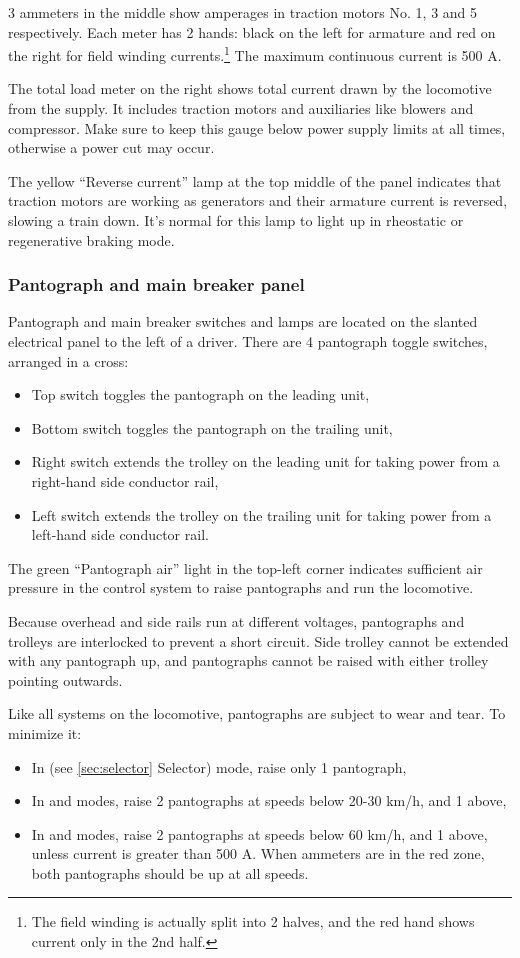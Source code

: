 \documentclass[11pt, a4paper]{article}
\newcommand{\powermode}[1]{%
    \begingroup
    \setlength{\fboxsep}{0pt}%
    \raisebox{0.1em}{%
        \colorbox{black}{%
            \parbox[c][1.4em][c]{1.4em}{%
                \centering
                \color{white}\bfseries #1%
            }%
        }%
    }%
    \endgroup
}
\newcommand{\brakemode}[1]{%
    \begingroup
    \setlength{\fboxsep}{0pt}%
    \raisebox{0.1em}{%
        \colorbox{red}{%
            \parbox[c][1.4em][c]{1.4em}{%
                \centering
                \color{black}\bfseries #1%
            }%
        }%
    }%
    \endgroup
}
\begin{document}
3 ammeters in the middle show amperages in traction motors No. 1, 3 and 5 respectively. Each meter has 2 hands: black on the left for armature and red on the right for field winding currents.\footnote{The field winding is actually split into 2 halves, and the red hand shows current only in the 2nd half.} The maximum continuous current is 500 A.

The total load meter on the right shows total current drawn by the locomotive from the supply. It includes traction motors and auxiliaries like blowers and compressor. Make sure to keep this gauge below power supply limits at all times, otherwise a power cut may occur.

The yellow ``Reverse current'' lamp at the top middle of the panel indicates that traction motors are working as generators and their armature current is reversed, slowing a train down. It's normal for this lamp to light up in rheostatic or regenerative braking mode.
\newpage

\subsubsection{Pantograph and main breaker panel}
Pantograph and main breaker switches and lamps are located on the slanted electrical panel to the left of a driver. There are 4 pantograph toggle switches, arranged in a cross:
\begin{itemize}
\item Top switch toggles the pantograph on the leading unit,
\item Bottom switch toggles the pantograph on the trailing unit,
\item Right switch extends the trolley on the leading unit for taking power from a right-hand side conductor rail,
\item Left switch extends the trolley on the trailing unit for taking power from a left-hand side conductor rail.
\end{itemize}
The green ``Pantograph air'' light in the top-left corner indicates sufficient air pressure in the control system to raise pantographs and run the locomotive.

Because overhead and side rails run at different voltages, pantographs and trolleys are interlocked to prevent a short circuit. Side trolley cannot be extended with any pantograph up, and pantographs cannot be raised with either trolley pointing outwards.

Like all systems on the locomotive, pantographs are subject to wear and tear. To minimize it:
\begin{itemize}
\item In \powermode{Y} (see \ref{sec:selector} Selector) mode, raise only 1 pantograph,
\item In \powermode{S} and \brakemode{S} modes, raise 2 pantographs at speeds below 20-30 km/h, and 1 above,
\item In \powermode{P} and \brakemode{P} modes, raise 2 pantographs at speeds below 60 km/h, and 1 above, unless current is greater than 500 A. When ammeters are in the red zone, both pantographs should be up at all speeds.
\end{itemize}
\end{document}
